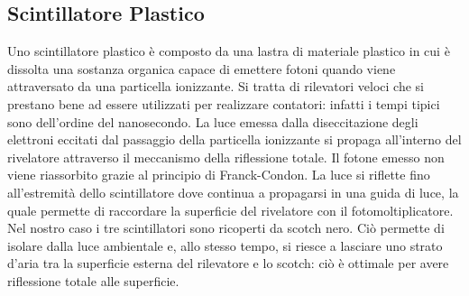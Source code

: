 \documentclass[a4paper,10pt]{article}
\begin{document}
\subsection{Scintillatore Plastico}
Uno scintillatore plastico è composto da una lastra di materiale plastico in cui è dissolta una sostanza organica capace di emettere fotoni quando viene attraversato da una particella ionizzante. Si tratta di rilevatori veloci che si prestano bene ad essere utilizzati per realizzare contatori: infatti i tempi tipici sono dell'ordine del nanosecondo. La luce emessa dalla diseccitazione degli elettroni eccitati dal passaggio della particella ionizzante si propaga all'interno del rivelatore attraverso il meccanismo della riflessione totale. Il fotone emesso non viene riassorbito grazie al principio di Franck-Condon. La luce si riflette fino all'estremità dello scintillatore dove continua a propagarsi in una guida di luce, la quale permette di raccordare la superficie del rivelatore con il fotomoltiplicatore. \\
Nel nostro caso i tre scintillatori sono ricoperti da scotch nero. Ciò permette di isolare dalla luce ambientale e, allo stesso tempo, si riesce a lasciare uno strato d'aria tra la superficie esterna del rilevatore e lo scotch: ciò è ottimale per avere riflessione totale alle superficie.
\end{document}
